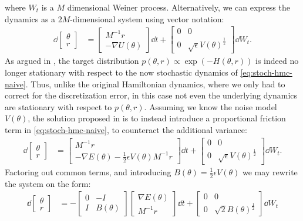where $W_t$ is a $M$ dimensional Weiner process.
Alternatively, we can express the dynamics as a $2M$-dimensional system using vector notation:
\begin{align} \label{eq:stoch-hmc-naive}
    \dd{\begin{bmatrix}\theta \\ r \end{bmatrix}} &= 
    \begin{bmatrix}
        M^{-1}r \\ -\nabla{U}(\theta) 
    \end{bmatrix} \dd{t} + \begin{bmatrix}
        0 & 0 \\ 
        0 & \sqrt{\epsilon} V(\theta)^{\frac{1}{2}}
    \end{bmatrix} \dd{W_t}.
\end{align}
As argued in \cite{chen_stochastic_2014}, the target distribution $p(\theta, r)\propto \exp(-H(\theta, r))$ is indeed no longer stationary with respect to the now stochastic dynamics of \cref{eq:stoch-hmc-naive}.
Thus, unlike the original Hamiltonian dynamics, where we only had to correct for the discretization error, in this case not even the underlying dynamics are stationary with respect to $p(\theta, r)$.
Assuming we know the noise model $V(\theta)$, the solution proposed in \cite{chen_stochastic_2014} is to instead introduce a proportional friction term in \cref{eq:stoch-hmc-naive}, to counteract the additional variance:
\begin{align} \label{eq:stoch-hmc-w-friction}
    \dd{\begin{bmatrix}\theta \\ r \end{bmatrix}} &= 
    \begin{bmatrix}
        M^{-1}r \\ -\nabla{E}(\theta)-\frac{1}{2}\epsilon V(\theta)M^{-1}r
    \end{bmatrix} \dd{t} + \begin{bmatrix}
        0 & 0 \\ 
        0 & \sqrt{\epsilon} V(\theta)^{\frac{1}{2}}
    \end{bmatrix} \dd{W_t}.
\end{align}
Factoring out common terms, and introducing $B(\theta) = \frac{1}{2}\epsilon V(\theta)$ we may rewrite the system on the form:
\begin{align}
    \dd{\begin{bmatrix}\theta \\ r \end{bmatrix}} &= 
    -\begin{bmatrix}
        0 & -I \\ 
        I & B(\theta)
    \end{bmatrix} \begin{bmatrix}
        \nabla{E}(\theta)  \\ M^{-1}r
    \end{bmatrix}\dd{t} + \begin{bmatrix}
        0 & 0 \\ 
        0 & \sqrt{2} B(\theta)^{\frac{1}{2}}
    \end{bmatrix} \dd{W_t} 
\end{align}
